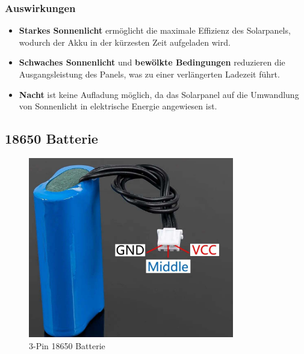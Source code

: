 \documentclass{vorlage-design-main}
\begin{document}
\hypertarget{auswirkungen}{%
\subsubsection{Auswirkungen}\label{auswirkungen}}

\begin{itemize}

\item
  \textbf{Starkes Sonnenlicht} ermöglicht die maximale Effizienz des
  Solarpanels, wodurch der Akku in der kürzesten Zeit aufgeladen wird.
\item
  \textbf{Schwaches Sonnenlicht} und \textbf{bewölkte Bedingungen}
  reduzieren die Ausgangsleistung des Panels, was zu einer verlängerten
  Ladezeit führt.
\item
  \textbf{Nacht} ist keine Aufladung möglich, da das Solarpanel auf die
  Umwandlung von Sonnenlicht in elektrische Energie angewiesen ist.
\end{itemize}

\hypertarget{batterie}{%
\subsection{18650 Batterie}\label{batterie}}

\begin{figure}
\centering
\includegraphics[width=0.8\textwidth]{images/3pin_battery.pdf}
\floatnotes{}
\caption{3-Pin 18650 Batterie}
\end{figure}
\end{document}
